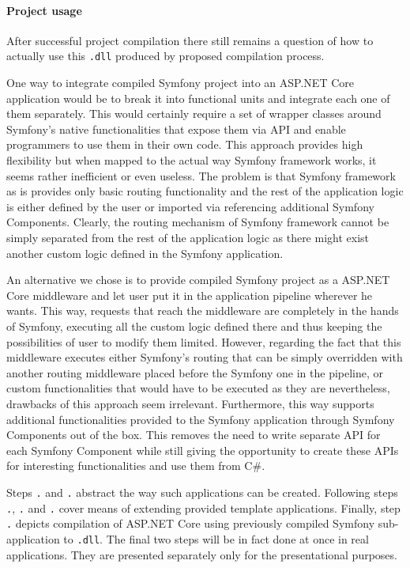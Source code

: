 \paragraph{Project usage} After successful project compilation there still remains a question of how to actually use this \texttt{.dll} produced by proposed compilation process.

One way to integrate compiled Symfony project into an ASP.NET Core application would be to break it into functional units and integrate each one of them separately. This would certainly require a set of wrapper classes around Symfony's native functionalities that expose them via API and enable programmers to use them in their own code. This approach provides high flexibility but when mapped to the actual way Symfony framework works, it seems rather inefficient or even useless. The problem is that Symfony framework as is provides only basic routing functionality and the rest of the application logic is either defined by the user or imported via referencing additional Symfony Components. Clearly, the routing mechanism of Symfony framework cannot be simply separated from the rest of the application logic as there might exist another custom logic defined in the Symfony application.

An alternative we chose is to provide compiled Symfony project as a ASP.NET Core middleware and let user put it in the application pipeline wherever he wants. This way, requests that reach the middleware are completely in the hands of Symfony, executing all the custom logic defined there and thus keeping the possibilities of user to modify them limited. However, regarding the fact that this middleware executes either Symfony's routing that can be simply overridden with another routing middleware placed before the Symfony one in the pipeline, or custom functionalities that would have to be executed as they are nevertheless, drawbacks of this approach seem irrelevant. Furthermore, this way supports additional functionalities provided to the Symfony application through Symfony Components out of the box. This removes the need to write separate API for each Symfony Component while still giving the opportunity to create these APIs for interesting functionalities and use them from C\#. 

Steps \texttt{.} and \texttt{.} abstract the way such applications can be created. Following steps \texttt{.}, \texttt{.} and \texttt{.} cover means of extending provided template applications. Finally, step \texttt{.} depicts compilation of ASP.NET Core using previously compiled Symfony sub-application to \texttt{.dll}. The final two steps will be in fact done at once in real applications. They are presented separately only for the presentational purposes.


